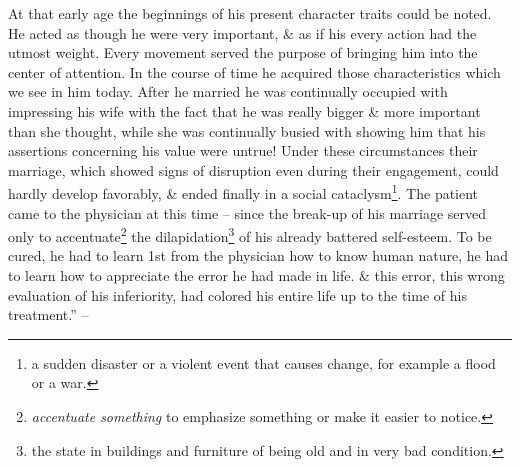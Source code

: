 \documentclass{article}
\begin{document}
At that early age the beginnings of his present character traits could be noted. He acted as though he were very important, \& as if his every action had the utmost weight. Every movement served the purpose of bringing him into the center of attention. In the course of time he acquired those characteristics which we see in him today. After he married he was continually occupied with impressing his wife with the fact that he was really bigger \& more important than she thought, while she was continually busied with showing him that his assertions concerning his value were untrue! Under these circumstances their marriage, which showed signs of disruption even during their engagement, could hardly develop favorably, \& ended finally in a social cataclysm\footnote{a sudden disaster or a violent event that causes change, for example a flood or a war.}. The patient came to the physician at this time -- since the break-up of his marriage served only to accentuate\footnote{{\it accentuate something} to emphasize something or make it easier to notice.} the dilapidation\footnote{the state in buildings and furniture of being old and in very bad condition.} of his already battered self-esteem. To be cured, he had to learn 1st from the physician how to know human nature, he had to learn how to appreciate the error he had made in life. \& this error, this wrong evaluation of his inferiority, had colored his entire life up to the time of his treatment.'' -- \cite[pp. 72--80]{Adler_human_nature}
\end{document}
